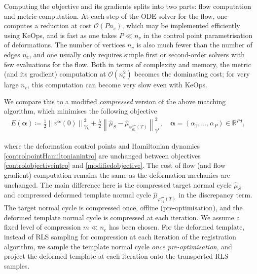 \documentclass[sn-mathphys-num]{sn-jnl}%
\theoremstyle{thmstyleone}%
\theoremstyle{thmstyletwo}%
\theoremstyle{thmstylethree}%
\numberwithin{remark}{section}
\numberwithin{definition}{section}
\numberwithin{equation}{section}
\numberwithin{theorem}{section}
\newcommand{\norm}[1]{\left\lVert#1\right\rVert}
\newcommand{\R}{\ensuremath{\mathbb{R}}}%
\newcommand{\tit}[1]{\textit{#1}}
\begin{document}
 Computing the objective and its gradients splits into two parts: flow computation and metric computation. At each step of the ODE solver for the flow, one computes a reduction at cost $\mathcal{O}(Pn_{v} )$, which may be implemented efficiently using KeOps, and is fast as one takes $P\ll n_{v}$ in the control point parametrisation of deformations. The number of vertices $n_{v}$ is also much fewer than the number of edges $n_{e}$, and one usually only requires simple first or second-order solvers with few evaluations for the flow. Both in terms of complexity and memory, the metric (and its gradient) computation at $\mathcal{O}(n_{e}^{2})$ becomes the dominating cost; for very large $n_{e}$, this computation can become very slow even with KeOps.

 We compare this to a modified \tit{compressed} version of the above matching algorithm, which minimises the following objective
    \begin{align}\label{modifiedobjective}
E(\bm{\alpha}) \coloneq \frac{1}{2}\norm{v^{\bm{\alpha} }(0)}_{V_{k}}^{2} + \frac{\lambda}{2} \norm{\hat{\mu}_{S} - \hat{\mu}_{\varphi^{v^{\bm{\alpha} }}_{01}(T)} }_{V^{*}}^{2} ,\quad \bm{\alpha} =(\alpha_{1},\dots,\alpha_{P} ) \in \R^{Pd},
\end{align}


where the deformation control points and Hamiltonian dynamics \cref{controlpointHamiltonianintro} are unchanged between objectives \cref{controlobjectiveintro} and \cref{modifiedobjective}. The cost of flow (and flow gradient) computation remains the same as the deformation mechanics are unchanged. The main difference here is the compressed target normal cycle $\hat{\mu}_{S}$ and compressed deformed template normal cycle $\hat{\mu}_{\varphi^{v^{\bm{\alpha} }}_{01}(T)}$ in the discrepancy term. The target normal cycle is compressed once, offline (pre-optimisation), and the deformed template normal cycle is compressed at each iteration. We assume a fixed level of compression $m\ll n_{e}$ has been chosen. For the deformed template, instead of RLS sampling for compression at each iteration of the registration algorithm,  we sample the template normal cycle \textit{once pre-optimisation}, and project the deformed template at each iteration onto the transported RLS samples.
\end{document}
